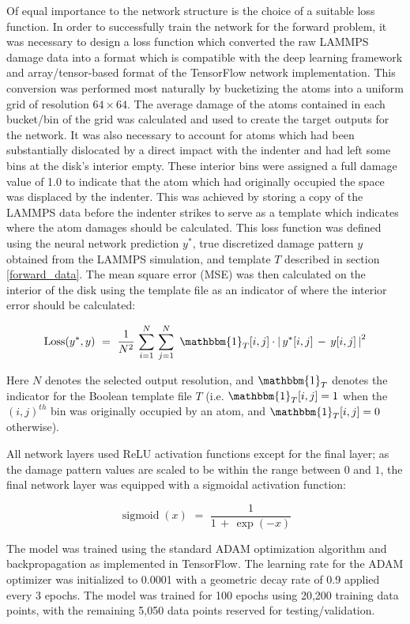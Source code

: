 Of equal importance to the network structure is the choice of a suitable loss function. In order to successfully train the network for the forward problem, it was necessary to design a loss function which converted the raw LAMMPS damage data into a format which is compatible with the deep learning framework and array/tensor-based format of the TensorFlow network implementation.  This conversion was performed most naturally by bucketizing the atoms into a uniform grid of resolution $64 \times 64$.  The average damage of the atoms contained in each bucket/bin of the grid was calculated and used to create the target outputs for the network.  It was also necessary to account for atoms which had been substantially dislocated by a direct impact with the indenter and had left some bins at the disk’s interior empty.  These interior bins were assigned a full damage value of 1.0 to indicate that the atom which had originally occupied the space was displaced by the indenter.  This was achieved by storing a copy of the LAMMPS data before the indenter strikes to serve as a template which indicates where the atom damages should be calculated.
This loss function was defined using the neural network prediction $y^*$, true discretized damage pattern $y$ obtained from the LAMMPS simulation, and template $T$ described in section \ref{forward_data}.
The mean square error (MSE) was then calculated on the interior of the disk using the template file as an indicator of where the interior error should be calculated:

\[
\operatorname{Loss}(y^*, y) \, \, = \, \, \frac{1}{N^2} \, \sum_{i=1}^N \, \sum_{j=1}^N \, \, \mathbbm{1}_{T}[i,j] \cdot \left| \, y^*[i,j] \, - \, y[i,j]  \, \right|^2
\]


Here $N$ denotes the selected output resolution, and $\mathbbm{1}_T$ denotes the indicator for the Boolean template file $T$  (i.e. $\mathbbm{1}_{T}[i,j]=1$ when the $(i,j)^{th}$ bin was originally occupied by an atom, and $\mathbbm{1}_{T}[i,j]=0$ otherwise).


All network layers used ReLU activation functions except for the final layer; as the damage pattern values are scaled to be within the range between $0$ and $1$, the final network layer was equipped with a sigmoidal activation function:


\[
\operatorname{sigmoid}(x) \, \, = \, \, \frac{1}{1 \, + \, \exp(-x)}
\]

The model was trained using the standard ADAM optimization algorithm and backpropagation as implemented in TensorFlow.  The learning rate for the ADAM optimizer was initialized to 0.0001 with a geometric decay rate of 0.9 applied every 3 epochs.  The model was trained for 100 epochs using 20,200 training data points, with the remaining 5,050 data points reserved for testing/validation.  



